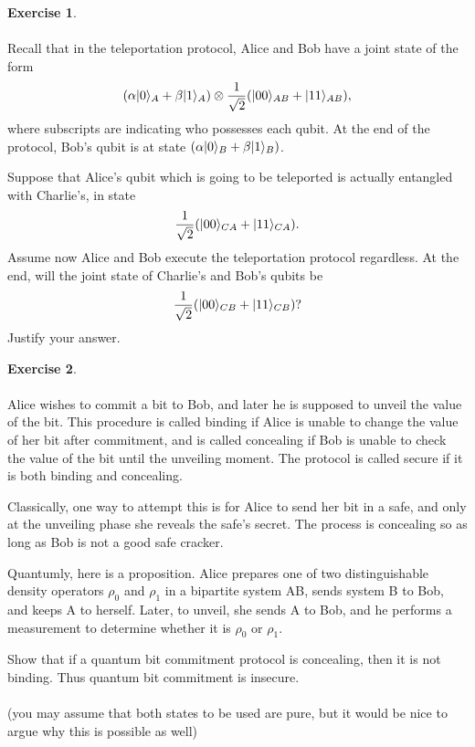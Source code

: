 \documentclass[12pt]{article}
\theoremstyle{plain}
\theoremstyle{definition}
\newtheorem{exerc}{Exercise}
\begin{document}
\noindent \hrulefill

\begin{exerc} \ \\ \ \\
Recall that in the teleportation protocol, Alice and Bob have a joint state of the form
\[
	(\alpha |0\rangle_A + \beta |1\rangle_A) \otimes \frac{1}{\sqrt{2}} (|00\rangle_{AB} + |11\rangle_{AB}),
\]
where subscripts are indicating who possesses each qubit. At the end of the protocol, Bob's qubit is at state $(\alpha |0\rangle_B + \beta |1\rangle_B)$.

Suppose that Alice's qubit which is going to be teleported is actually entangled with Charlie's, in state
\[
	\frac{1}{\sqrt{2}} (|00\rangle_{CA} + |11\rangle_{CA}).
\]
Assume now Alice and Bob execute the teleportation protocol regardless. At the end, will the joint state of Charlie's and Bob's qubits be
\[
	\frac{1}{\sqrt{2}} (|00\rangle_{CB} + |11\rangle_{CB}) ?
\]
Justify your answer.
\end{exerc}

\noindent \hrulefill

\begin{exerc} \ \\ \ \\
	Alice wishes to commit a bit to Bob, and later he is supposed to unveil the value of the bit. This procedure is called binding if Alice is unable to change the value of her bit after commitment, and is called concealing if Bob is unable to check the value of the bit until the unveiling moment. The protocol is called secure if it is both binding and concealing.
	
	Classically, one way to attempt this is for Alice to send her bit in a safe, and only at the unveiling phase she reveals the safe's secret. The process is concealing so as long as Bob is not a good safe cracker.
	
	Quantumly, here is a proposition. Alice prepares one of two distinguishable density operators $\rho_0$ and $\rho_1$ in a bipartite system AB, sends system B to Bob, and keeps A to herself. Later, to unveil, she sends A to Bob, and he performs a measurement to determine whether it is $\rho_0$ or $\rho_1$.
	
	Show that if a quantum bit commitment protocol is concealing, then it is not binding. Thus quantum bit commitment is insecure. 
\\ \ \\
	\noindent (you may assume that both states to be used are pure, but it would be nice to argue why this is possible as well)	 
\end{exerc}
\end{document}

